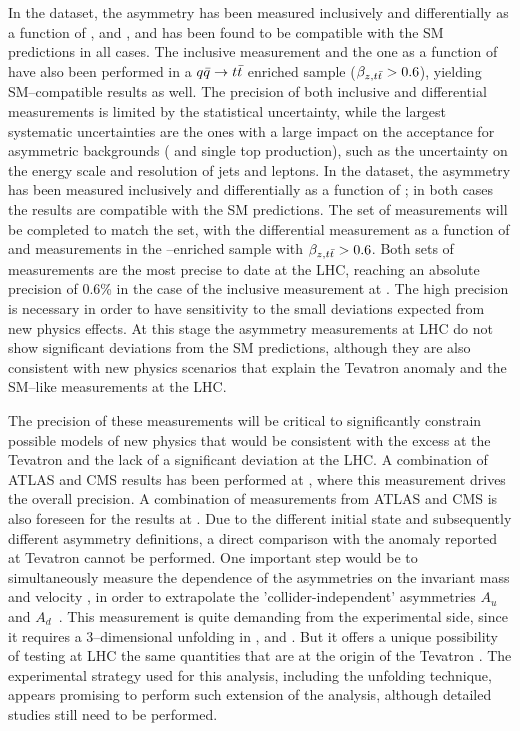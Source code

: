 In the \seventev{} dataset, the asymmetry \ac{} has been measured
inclusively and differentially as a function of \mtt{}, \pttt{} and \ytt{}, and has been found
to be compatible with the SM predictions in all cases. The inclusive
measurement and the one as a function of \mtt{} have also been performed in
a $q\bar{q}{}\to t\bar{t}{}$ enriched sample ($\beta_{z,t\bar{t}}{}>0.6$), yielding
SM--compatible results as well. The precision of both inclusive and
differential measurements is limited by the statistical uncertainty,
while the largest systematic uncertainties are the ones with a large
impact on the acceptance for asymmetric backgrounds (\wjets{} and
single top production), such as the uncertainty on the energy scale and
resolution of jets and leptons.
In the \eighttev{} dataset, the asymmetry \ac{} has been measured
inclusively and differentially as a function of \mtt{}; in both cases the results are
compatible with the SM predictions. The set of measurements will be
completed to match the \seventev{} set, with the differential
measurement as a function of \pttt{} and measurements in the
\qqbar{}--enriched sample with $\beta_{z,t\bar{t}}{}>0.6$.
Both sets of measurements are the most precise to date at the LHC,
reaching an absolute precision of 0.6\% in the case of the inclusive measurement
at \eighttev{}. The high precision is necessary in order to have
sensitivity to the small deviations expected from new physics effects.
At this stage the asymmetry measurements at LHC do not show
significant deviations from the SM predictions, although they are also
consistent with new physics scenarios that explain the Tevatron
anomaly and the SM--like \ac{} measurements at the LHC.

The precision of these measurements will be critical to significantly
constrain possible models of new physics that would be consistent with
the excess at the Tevatron and the lack of a significant deviation at
the LHC. A combination of ATLAS and CMS results has been performed at
\seventev{}, where this measurement drives the overall precision. A
combination of measurements from ATLAS and CMS is also foreseen for
the results at \eighttev{}.
Due to the different initial state and subsequently different
asymmetry definitions, a direct comparison with the anomaly reported
at Tevatron cannot be performed. One important step would be to
simultaneously measure the dependence of the asymmetries on the
\ttbar{} invariant mass \mtt{} and velocity \betatt{}, in order to
extrapolate the 'collider-independent' asymmetries $A_u$ and
$A_d$~\cite{AguilarSaavedra:2012va}. This measurement is quite
demanding from the experimental side, since it requires a
3--dimensional unfolding in \mtt{}, \betatt{} and \dy{}. But it offers
a unique possibility of testing at LHC the same quantities that are at
the origin of the Tevatron \afb{}.
The experimental strategy used for this analysis, including the
unfolding technique, appears promising to perform such extension of
the analysis, although detailed studies still need to be performed.

